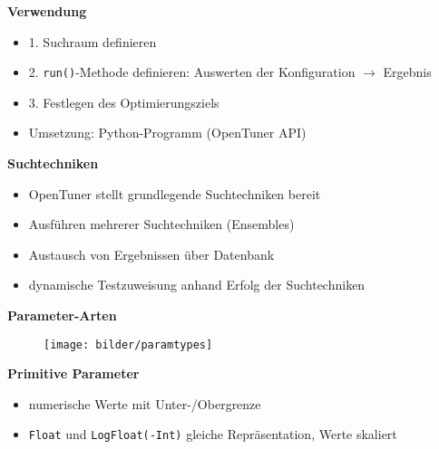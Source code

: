   \begingroup
  \begin{frame}
  \textbf{Verwendung}
  \begin{itemize}
    \item 1. Suchraum definieren 
    \item 2. \texttt{run()}-Methode definieren: Auswerten der Konfiguration $\rightarrow$ Ergebnis
    \item 3. Festlegen des Optimierungsziels
    \item Umsetzung: Python-Programm (OpenTuner API) \newline
    
  \end{itemize}
  \textbf{Suchtechniken}
  \begin{itemize}
    \item OpenTuner stellt grundlegende Suchtechniken bereit
    \item Ausführen mehrerer Suchtechniken (Ensembles)
    \item Austausch von Ergebnissen über Datenbank

    \item dynamische Testzuweisung anhand Erfolg der Suchtechniken

    
  \end{itemize}
  \end{frame}
  \endgroup
    
  \begingroup
  \begin{frame}
    \textbf{Parameter-Arten}
    \begin{figure}[ht]
      \centering	      
      \texttt{[image: bilder/paramtypes]}
      \label{paramtypes}
    \end{figure}
    
  \textbf{Primitive Parameter}
  \begin{itemize}
    \item numerische Werte mit Unter-/Obergrenze
    \item \texttt{Float} und \texttt{LogFloat(-Int)} gleiche Repräsentation, Werte skaliert
    
  \end{itemize}
  \end{frame}
  \endgroup
  
